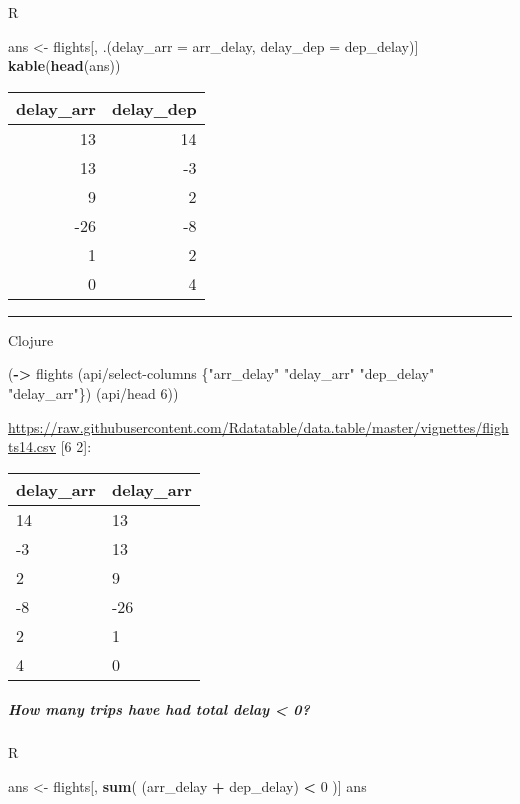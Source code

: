 \documentclass[]{article}
\newenvironment{Shaded}{\begin{snugshade}}{\end{snugshade}}
\newcommand{\KeywordTok}[1]{\textcolor[rgb]{0.13,0.29,0.53}{\textbf{#1}}}
\newcommand{\DataTypeTok}[1]{\textcolor[rgb]{0.13,0.29,0.53}{#1}}
\newcommand{\DecValTok}[1]{\textcolor[rgb]{0.00,0.00,0.81}{#1}}
\newcommand{\StringTok}[1]{\textcolor[rgb]{0.31,0.60,0.02}{#1}}
\newcommand{\OperatorTok}[1]{\textcolor[rgb]{0.81,0.36,0.00}{\textbf{#1}}}
\newcommand{\NormalTok}[1]{#1}
\let\oldsubparagraph\subparagraph
\renewcommand{\subparagraph}[1]{\oldsubparagraph{#1}\mbox{}}
\begin{document}
R

\begin{Shaded}
\begin{Highlighting}[]
\NormalTok{ans <-}\StringTok{ }\NormalTok{flights[, .(}\DataTypeTok{delay_arr =}\NormalTok{ arr_delay, }\DataTypeTok{delay_dep =}\NormalTok{ dep_delay)]}
\KeywordTok{kable}\NormalTok{(}\KeywordTok{head}\NormalTok{(ans))}
\end{Highlighting}
\end{Shaded}

\begin{longtable}[]{@{}rr@{}}
\toprule
delay\_arr & delay\_dep\tabularnewline
\midrule
\endhead
13 & 14\tabularnewline
13 & -3\tabularnewline
9 & 2\tabularnewline
-26 & -8\tabularnewline
1 & 2\tabularnewline
0 & 4\tabularnewline
\bottomrule
\end{longtable}

\begin{center}\rule{0.5\linewidth}{0.5pt}\end{center}

Clojure

\begin{Shaded}
\begin{Highlighting}[]
\NormalTok{(}\KeywordTok{->}\NormalTok{ flights}
\NormalTok{    (api/select-columns \{}\StringTok{"arr_delay"} \StringTok{"delay_arr"}
                         \StringTok{"dep_delay"} \StringTok{"delay_arr"}\NormalTok{\})}
\NormalTok{    (api/head }\DecValTok{6}\NormalTok{))}
\end{Highlighting}
\end{Shaded}

\url{https://raw.githubusercontent.com/Rdatatable/data.table/master/vignettes/flights14.csv}
{[}6 2{]}:

\begin{longtable}[]{@{}ll@{}}
\toprule
delay\_arr & delay\_arr\tabularnewline
\midrule
\endhead
14 & 13\tabularnewline
-3 & 13\tabularnewline
2 & 9\tabularnewline
-8 & -26\tabularnewline
2 & 1\tabularnewline
4 & 0\tabularnewline
\bottomrule
\end{longtable}

\subparagraph{How many trips have had total delay \textless{}
0?}\label{how-many-trips-have-had-total-delay-0}

R

\begin{Shaded}
\begin{Highlighting}[]
\NormalTok{ans <-}\StringTok{ }\NormalTok{flights[, }\KeywordTok{sum}\NormalTok{( (arr_delay }\OperatorTok{+}\StringTok{ }\NormalTok{dep_delay) }\OperatorTok{<}\StringTok{ }\DecValTok{0}\NormalTok{ )]}
\NormalTok{ans}
\end{Highlighting}
\end{Shaded}
\end{document}
